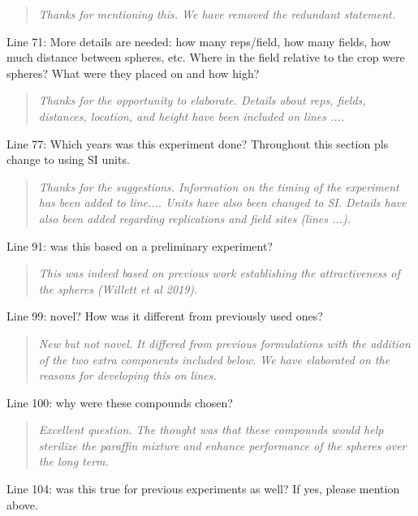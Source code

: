\documentclass{article}
\begin{document}
\begin{quote}
    \textit{Thanks for mentioning this.  We have removed the redundant statement.  }
\end{quote}

Line 71: More details are needed: how many reps/field, how many fields, how much distance between spheres, etc. Where in the field relative to the crop were spheres? What were they placed on and how high?

\begin{quote}
    \textit{Thanks for the opportunity to elaborate.  Details about reps, fields, distances, location, and height have been included on lines ....}
\end{quote}

Line 77: Which years was this experiment done? Throughout this section pls change to using SI units.

\begin{quote}
    \textit{Thanks for the suggestions.  Information on the timing of the experiment has been added to line.... Units have also been changed to SI.  Details have also been added regarding replications and field sites (lines ...).  }
\end{quote}

Line 91: was this based on a preliminary experiment?

\begin{quote}
    \textit{This was indeed based on previous work establishing the attractiveness of the spheres (Willett et al 2019). }
\end{quote}

Line 99: novel? How was it different from previously used ones?

\begin{quote}
    \textit{New but not novel.  It differed from previous formulations with the addition of the two extra components included below.  We have elaborated on the reasons for developing this on lines.   }
\end{quote}

Line 100: why were these compounds chosen?

\begin{quote}
    \textit{Excellent question.  The thought was that these compounds would help sterilize the paraffin mixture and enhance performance of the spheres over the long term.  }
\end{quote}

Line 104: was this true for previous experiments as well? If yes, please mention above.
\end{document}
